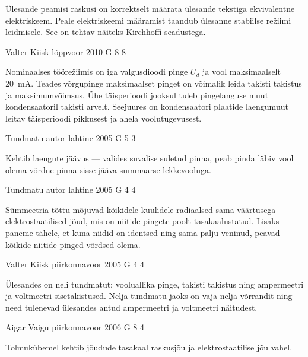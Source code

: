 \documentclass[11pt, twoside]{article}
\begin{document}
{{\ifHint
Ülesande peamisi raskusi on korrektselt määrata ülesande tekstiga ekvivalentne elektriskeem. Peale elektriskeemi määramist taandub ülesanne stabiilse režiimi leidmisele. See on tehtav näiteks Kirchhoffi seadustega.
\fi
}

{Valter Kiisk} %
{lõppvoor} %
{2010} %
{G 8} %
{8} %
{

\ifHint
Nominaalses töörežiimis on iga valgusdioodi pinge $U_d$ ja vool maksimaalselt \SI{20}{mA}. Teades võrgupinge maksimaalset pinget on võimalik leida takisti takistus ja maksimumvõimsus. Ühe täisperioodi jooksul tuleb pingelanguse muut kondensaatoril takisti arvelt. Seejuures on kondensaatori plaatide laengumuut leitav täisperioodi pikkusest ja ahela voolutugevusest.
\fi
}

{Tundmatu autor} %
{lahtine} %
{2005} %
{G 5} %
{3} %
{

\ifHint
Kehtib laengute jäävus --- valides suvalise suletud pinna, peab pinda läbiv vool olema võrdne pinna sisse jääva summaarse lekkevooluga.
\fi
}

{Tundmatu autor} %
{lahtine} %
{2005} %
{G 4} %
{4} %
{

\ifHint
Sümmeetria tõttu mõjuvad kõikidele kuulidele radiaalsed sama väärtusega elektrostaatilised jõud, mis on niitide pingete poolt tasakaalustatud. Lisaks paneme tähele, et kuna niidid on identsed ning sama palju veninud, peavad kõikide niitide pinged võrdsed olema.
\fi
}

{Valter Kiisk} %
{piirkonnavoor} %
{2005} %
{G 4} %
{4} %
{

\ifHint
Ülesandes on neli tundmatut: vooluallika pinge, takisti takistus ning ampermeetri ja voltmeetri sisetakistused. Nelja tundmatu jaoks on vaja nelja võrrandit ning need tulenevad ülesandes antud ampermeetri ja voltmeetri näitudest.
\fi
}

{Aigar Vaigu} %
{piirkonnavoor} %
{2006} %
{G 8} %
{4} %
{

\ifHint
Tolmukübemel kehtib jõudude tasakaal raskusjõu ja elektrostaatilise jõu vahel.
\fi
}

}
\end{document}
